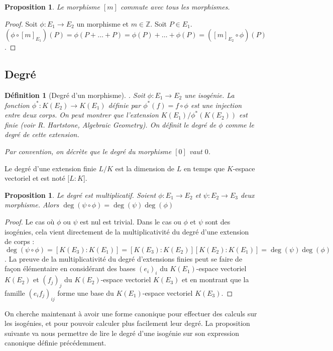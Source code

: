 \documentclass{article}
\theoremstyle{plain}%
\newtheorem{prop}[thm]{Proposition}
\newtheorem{deff}[thm]{Définition}
\theoremstyle{definition}%
\newcommand{\Z}{\mathbb{Z}}
\begin{document}
\begin{prop}
  Le morphisme $[m]$ commute avec tous les morphismes. 
\end{prop}

\begin{proof}
  Soit $\phi : E_1\to E_2$ un morphisme et $m\in\Z$. Soit $P\in E_1$. $(\phi \circ [m]_{E_1})(P) = \phi(P + \ldots + P) = \phi(P) + \ldots + \phi(P) = ([m]_{E_2} \circ \phi)(P)$.
\end{proof}

\subsection{Degré}

\begin{deff}[Degré d'un morphisme]. 
  Soit $\phi : E_1 \to E_2$ une isogénie. La fonction $\phi^* : K(E_2) \to K(E_1)$ définie par $\phi^*(f) = f \circ \phi$ est une injection entre deux corps. On peut montrer que l'extension $K(E_1)/\phi^*(K(E_2))$ est finie (voir R. Hartstone, Algebraic Geometry). On définit le degré de $\phi$ comme le degré de cette extension.
  
  Par convention, on décrète que le degré du morphisme $[0]$ vaut $0$.
\end{deff}

Le degré d'une extension finie $L/K$ est la dimension de $L$ en temps que $K$-espace vectoriel et est noté $[L : K$].

\begin{prop}
  Le degré est multiplicatif. Soient $\phi : E_1\to E_2$ et $\psi : E_2\to E_3$ deux morphisme. Alors $\deg(\psi \circ \phi) = \deg(\psi)\deg(\phi)$ 
\end{prop}

\begin{proof}
  Le cas où $\phi$ ou $\psi$ est nul est trivial. Dans le cas ou $\phi$ et $\psi$ sont des isogénies, cela vient directement de la multiplicativité du degré d'une extension de corps : $\deg(\psi \circ \phi) = [K(E_3) :K(E_1)] = [K(E_3):K(E_2)][K(E_2):K(E_1)] = \deg(\psi)\deg(\phi)$. La preuve de la multiplicativité du degré d'extensions finies peut se faire de façon élémentaire en considérant des bases $(e_i)_i$ du $K(E_1)$-espace vectoriel $K(E_2)$ et $(f_j)_j$ du $K(E_2)$-espace vectoriel $K(E_3)$ et en montrant que la famille $(e_if_j)_{ij}$ forme une base du $K(E_1)$-espace vectoriel $K(E_3)$.
\end{proof}

On cherche maintenant à avoir une forme canonique pour effectuer des calculs sur les isogénies, et pour pouvoir calculer plus facilement leur degré.
La proposition suivante va nous permettre de lire le degré d'une isogénie sur son expression canonique définie précédemment.
\end{document}
